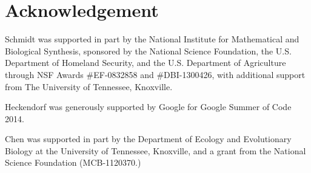 \section*{Acknowledgement}

Schmidt was supported in part by the National 
Institute for Mathematical and Biological Synthesis, 
sponsored by the National Science Foundation, the 
U.S. Department of Homeland Security, and the U.S. 
Department of Agriculture through NSF Awards 
\#EF-0832858 and \#DBI-1300426, with additional 
support from The University of Tennessee, Knoxville. 

Heckendorf was generously supported by Google for Google 
Summer of Code 2014.

Chen was supported in part by
the Department of Ecology and Evolutionary Biology at the
University of Tennessee, Knoxville, and a grant from
the National Science Foundation (MCB-1120370.)
